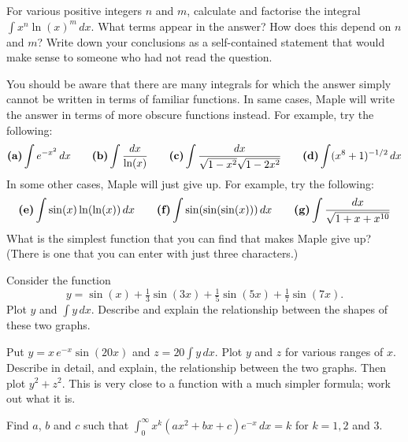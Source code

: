 \documentclass[a4paper,10pt]{amsbook}
\begin{document}
\begin{exercise}
 For various positive integers $n$ and $m$, calculate and
 factorise the integral $\int x^n\ln(x)^m\,dx$.  What terms
 appear in the answer?  How does this depend on $n$ and $m$?
 Write down your conclusions as a self-contained statement
 that would make sense to someone who had not read the
 question. 
\end{exercise}

\begin{exercise}
 You should be aware that there are many integrals for which
 the answer simply cannot be written in terms of familiar
 functions.  In same cases, Maple will write the answer in
 terms of more obscure functions instead.  For example, try
 the following:
 \[ \text{\bf (a)} \int e^{-x^2}\,dx \hspace{2em}
    \text{\bf (b)} \int \frac{dx}{\ln(x)} \hspace{2em}
    \text{\bf (c)} \int \frac{dx}{\sqrt{1-x^2}\sqrt{1-2x^2}} \hspace{2em}
    \text{\bf (d)} \int (x^8+1)^{-1/2}\,dx
 \]
 In some other cases, Maple will just give up.  For example,
 try the following:
 \[ \text{\bf (e)} \int \sin(x)\ln(\ln(x))\,dx \hspace{2em}
    \text{\bf (f)} \int \sin(\sin(\sin(x)))\,dx \hspace{2em}
    \text{\bf (g)} \int \frac{dx}{\sqrt{1+x+x^{10}}}
 \]
 What is the simplest function that you can find that makes
 Maple give up?  (There is one that you can enter with just
 three characters.)
\end{exercise}

\begin{exercise}
 Consider the function
 \[ y = \sin(x) + \tfrac{1}{3}\sin(3x) +
        \tfrac{1}{5}\sin(5x) + \tfrac{1}{7}\sin(7x).
 \]
 Plot $y$ and $\int y\,dx$.  Describe and explain the
 relationship between the shapes of these two graphs.
\end{exercise}

\begin{exercise}
 Put $y=x\,e^{-x}\sin(20x)$ and $z=20 \int y\,dx$.  Plot $y$ and
 $z$ for various ranges of $x$.  Describe in detail, and
 explain, the relationship between the two graphs.  Then
 plot $y^2+z^2$.  This is very close to a function with a
 much simpler formula; work out what it is.
\end{exercise}

\begin{exercise}
 Find $a$, $b$ and $c$ such that
 $\int_0^\infty x^k(ax^2+bx+c)e^{-x}\,dx=k$ for $k=1,2$ and $3$.
\end{exercise}
\end{document}
